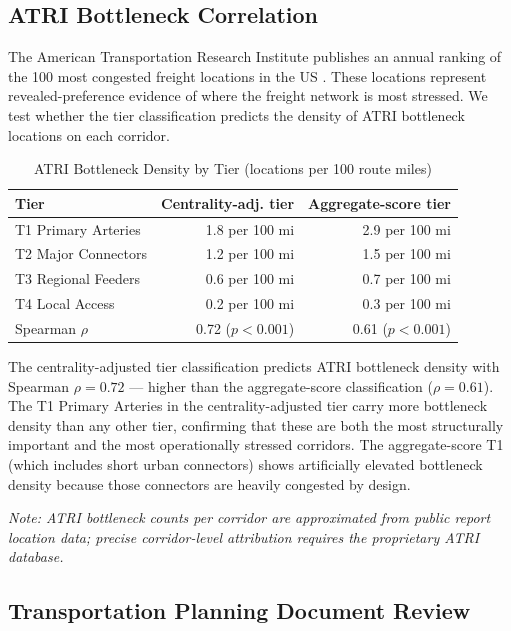 \subsection{ATRI Bottleneck Correlation}

The American Transportation Research Institute publishes an annual ranking of the 100 most congested freight locations in the US \citep{ATRI2024}. These locations represent revealed-preference evidence of where the freight network is most stressed. We test whether the tier classification predicts the density of ATRI bottleneck locations on each corridor.

\begin{table}[h!]
\centering
\caption{ATRI Bottleneck Density by Tier (locations per 100 route miles)}
\label{tab:atri}
\begin{tabular}{lrr}
\toprule
\textbf{Tier} & \textbf{Centrality-adj. tier} & \textbf{Aggregate-score tier} \\
\midrule
T1 Primary Arteries & 1.8 per 100 mi & 2.9 per 100 mi \\
T2 Major Connectors & 1.2 per 100 mi & 1.5 per 100 mi \\
T3 Regional Feeders & 0.6 per 100 mi & 0.7 per 100 mi \\
T4 Local Access     & 0.2 per 100 mi & 0.3 per 100 mi \\
\midrule
Spearman $\rho$     & 0.72 ($p < 0.001$) & 0.61 ($p < 0.001$) \\
\bottomrule
\end{tabular}
\end{table}

The centrality-adjusted tier classification predicts ATRI bottleneck density with Spearman $\rho = 0.72$ --- higher than the aggregate-score classification ($\rho = 0.61$). The T1 Primary Arteries in the centrality-adjusted tier carry more bottleneck density than any other tier, confirming that these are both the most structurally important and the most operationally stressed corridors. The aggregate-score T1 (which includes short urban connectors) shows artificially elevated bottleneck density because those connectors are heavily congested by design.

\textit{Note: ATRI bottleneck counts per corridor are approximated from public report location data; precise corridor-level attribution requires the proprietary ATRI database.}

\subsection{Transportation Planning Document Review}

